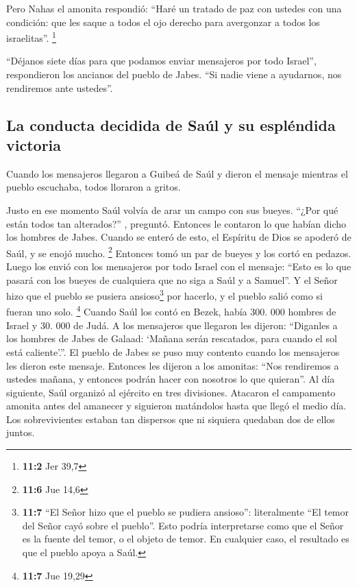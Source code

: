  Pero Nahas el amonita respondió: ``Haré un tratado de paz
con ustedes con una condición: que les saque a todos el ojo derecho para
avergonzar a todos los israelitas''. \footnote{\textbf{11:2} Jer 39,7}

 ``Déjanos siete días para que podamos enviar mensajeros
por todo Israel'', respondieron los ancianos del pueblo de Jabes. ``Si
nadie viene a ayudarnos, nos rendiremos ante ustedes''.

\hypertarget{la-conducta-decidida-de-sauxfal-y-su-espluxe9ndida-victoria}{%
\subsection{La conducta decidida de Saúl y su espléndida
victoria}\label{la-conducta-decidida-de-sauxfal-y-su-espluxe9ndida-victoria}}

 Cuando los mensajeros llegaron a Guibeá de Saúl y dieron
el mensaje mientras el pueblo escuchaba, todos lloraron a gritos.

 Justo en ese momento Saúl volvía de arar un campo con sus
bueyes. ``¿Por qué están todos tan alterados?'' , preguntó. Entonces le
contaron lo que habían dicho los hombres de Jabes.  Cuando
se enteró de esto, el Espíritu de Dios se apoderó de Saúl, y se enojó
mucho. \footnote{\textbf{11:6} Jue 14,6}  Entonces tomó un
par de bueyes y los cortó en pedazos. Luego los envió con los mensajeros
por todo Israel con el mensaje: ``Esto es lo que pasará con los bueyes
de cualquiera que no siga a Saúl y a Samuel''. Y el Señor hizo que el
pueblo se pusiera ansioso\footnote{\textbf{11:7} ``El Señor hizo que el
  pueblo se pudiera ansioso'': literalmente ``El temor del Señor cayó
  sobre el pueblo''. Esto podría interpretarse como que el Señor es la
  fuente del temor, o el objeto de temor. En cualquier caso, el
  resultado es que el pueblo apoya a Saúl.} por hacerlo, y el pueblo
salió como si fueran uno solo. \footnote{\textbf{11:7} Jue 19,29}
 Cuando Saúl los contó en Bezek, había 300. 000 hombres de
Israel y 30. 000 de Judá.  A los mensajeros que llegaron
les dijeron: ``Diganles a los hombres de Jabes de Galaad: `Mañana serán
rescatados, para cuando el sol está caliente'.''. El pueblo de Jabes se
puso muy contento cuando los mensajeros les dieron este mensaje.
 Entonces les dijeron a los amonitas: ``Nos rendiremos a
ustedes mañana, y entonces podrán hacer con nosotros lo que quieran''.
 Al día siguiente, Saúl organizó al ejército en tres
divisiones. Atacaron el campamento amonita antes del amanecer y
siguieron matándolos hasta que llegó el medio día. Los sobrevivientes
estaban tan dispersos que ni siquiera quedaban dos de ellos juntos.

